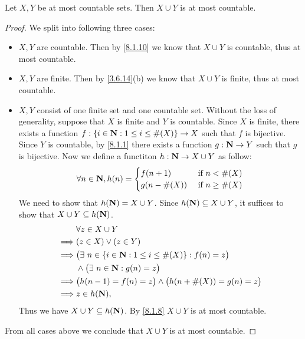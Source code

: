 \begin{additional corollary}\label{ac 8.1.1}
Let \(X, Y\) be at most countable sets.
Then \(X \cup Y\) is at most countable.
\end{additional corollary}

\begin{proof}
  We split into following three cases:
  \begin{itemize}
    \item \(X, Y\) are countable.
          Then by \cref{8.1.10} we know that \(X \cup Y\) is countable, thus at most countable.
    \item \(X, Y\) are finite.
          Then by \cref{3.6.14}(b) we know that \(X \cup Y\) is finite, thus at most countable.
    \item \(X, Y\) consist of one finite set and one countable set.
          Without the loss of generality, suppose that \(X\) is finite and \(Y\) is countable.
          Since \(X\) is finite, there exists a function \(f : \{i \in \mathbf{N} : 1 \leq i \leq \#(X)\} \to X\) such that \(f\) is bijective.
          Since \(Y\) is countable, by \cref{8.1.1} there exists a function \(g : \mathbf{N} \to Y\) such that \(g\) is bijective.
          Now we define a functiton \(h : \mathbf{N} \to X \cup Y\) as follow:
          \[
            \forall n \in \mathbf{N}, h(n) = \begin{cases}
              f(n + 1)     & \text{ if } n < \#(X)    \\
              g(n - \#(X)) & \text{ if } n \geq \#(X)
            \end{cases}
          \]
          We need to show that \(h(\mathbf{N}) = X \cup Y\).
          Since \(h(\mathbf{N}) \subseteq X \cup Y\), it suffices to show that \(X \cup Y \subseteq h(\mathbf{N})\).
          \begin{align*}
                     & \forall z \in X \cup Y                                                 \\
            \implies & (z \in X) \lor (z \in Y)                                               \\
            \implies & \big(\exists\ n \in \{i \in \mathbf{N} : 1 \leq i \leq \#(X)\} : f(n) = z\big) \\
                     & \land \big(\exists\ n \in \mathbf{N} : g(n) = z\big)                           \\
            \implies & \big(h(n - 1) = f(n) = z\big) \land \big(h(n + \#(X)) = g(n) = z\big)  \\
            \implies & z \in h(\mathbf{N}),
          \end{align*}
          Thus we have \(X \cup Y \subseteq h(\mathbf{N})\).
          By \cref{8.1.8} \(X \cup Y\) is at most countable.
  \end{itemize}
  From all cases above we conclude that \(X \cup Y\) is at most countable.
\end{proof}

